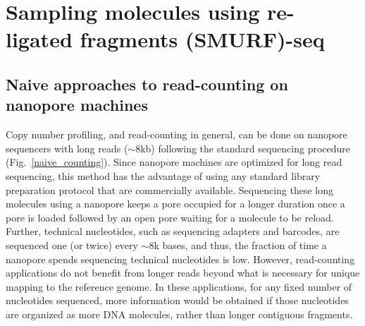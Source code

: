 \chapter{Sampling molecules using re-ligated fragments (SMURF)-seq}
\label{ch3}


\section{Naive approaches to read-counting on nanopore machines}
Copy number profiling, and read-counting in general, can be done on
nanopore sequencers with long reads ($\sim$8kb) following the standard
sequencing procedure (Fig.~\ref{naive_counting}).
Since nanopore machines are optimized for long read sequencing, this
method has the advantage of using any standard library preparation
protocol that are commercially available.  Sequencing these long
molecules using a nanopore keeps a pore occupied for a longer duration
once a pore is loaded followed by an open pore waiting for a molecule to
be reload.  Further, technical nucleotides, such as sequencing adapters
and barcodes, are sequenced one (or twice) every $\sim$8k bases, and
thus, the fraction of time a nanopore spends sequencing technical
nucleotides is low.
However, read-counting applications do not benefit from longer reads
beyond what is necessary for unique mapping to the reference genome. In
these applications, for any fixed number of nucleotides sequenced, more
information would be obtained if those nucleotides are organized as more
DNA molecules, rather than longer contiguous fragments.

